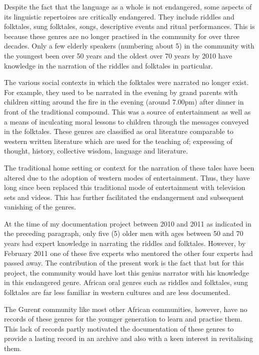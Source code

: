 \documentclass[output=paper,colorlinks,citecolor=brown]{langscibook}
\begin{document}
Despite the fact that the language as a whole is not endangered, some aspects of its linguistic repertoires are critically endangered. They include riddles and folktales, sung folktales, songs, descriptive events and ritual performances. This is because these genres are no longer practised in the community for over three decades. Only a few elderly speakers (numbering about 5) in the community with the youngest been over 50 years and the oldest over 70 years by 2010 have knowledge in the narration of the riddles and folktales in particular. 

The various social contexts in which the folktales were narrated no longer exist. For example, they used to be narrated in the evening by grand parents with children sitting around the fire in the evening (around 7.00pm) after dinner in front of the traditional compound. This was a source of entertainment as well as a means of inculcating moral lessons to children through the messages conveyed in the folktales. These genres are classified as oral literature comparable to western written literature which are used for the teaching of; expressing of thought, history, collective wisdom, language and literature. 

The traditional home setting or context for the narration of these tales have been altered due to the adoption of western modes of entertainment. Thus, they have long since been replaced this traditional mode of entertainment with television sets and videos. This has further facilitated the endangerment and subsequent vanishing of the genres.

At the time of my documentation project between 2010 and 2011 as indicated in the preceding paragraph, only five (5) older men with ages between 50 and 70 years had expert knowledge in narrating the riddles and folktales. However, by February 2011 one of these five experts who mentored the other four experts had passed away. The contribution of the present work is the fact that but for this project, the community would have lost this genius narrator with his knowledge in this endangered genre. African oral genres such as riddles and folktales, sung folktales are far less familiar in western cultures and are less documented. 

The Gurenɛ community like most other African communities, however, have no records of these genres for the younger generation to learn and practise them. This lack of records partly motivated the documentation of these genres to provide a lasting record in an archive and also with a keen interest in revitalising them. 
\end{document}
